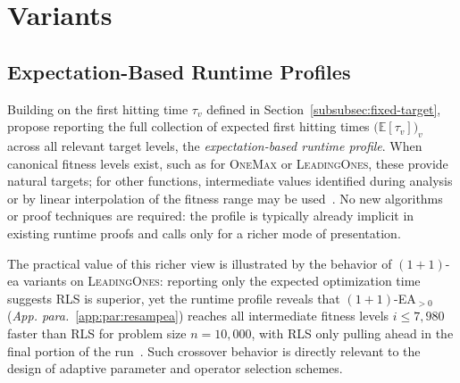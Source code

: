 
\section{Variants}

\subsection{Expectation-Based Runtime Profiles}

Building on the first hitting time $\tau_v$ defined in
Section~\ref{subsubsec:fixed-target}, \citet{pinto2018practice} propose
reporting the full collection of expected first hitting times
$\bigl(\mathbb{E}[\tau_v]\bigr)_{v}$ across all relevant target levels, the
\textit{expectation-based runtime profile}. When canonical fitness
levels exist, such
as for \textsc{OneMax} or \textsc{LeadingOnes}, these provide natural
targets; for
other functions, intermediate values identified during analysis or by linear
interpolation of the fitness range may be used~\cite{pinto2018practice}. No new
algorithms or proof techniques are required: the profile is typically
already implicit
in existing runtime proofs and calls only for a richer mode of presentation.

The practical value of this richer view is illustrated by the
behavior of $(1+1)$-\acrshort{ea}
variants on \textsc{LeadingOnes}: reporting only the expected
optimization time suggests
RLS is superior, yet the runtime profile reveals that
$(1+1)$-EA$_{>0}$ (\textit{App. para.}~\ref{app:par:resampea})
reaches all intermediate fitness levels $i \leq 7{,}980$ faster than
RLS for problem
size $n = 10{,}000$, with RLS only pulling ahead in the final portion of the
run~\cite{pinto2018practice}. Such crossover behavior is directly
relevant to the
design of adaptive parameter and operator selection schemes.

